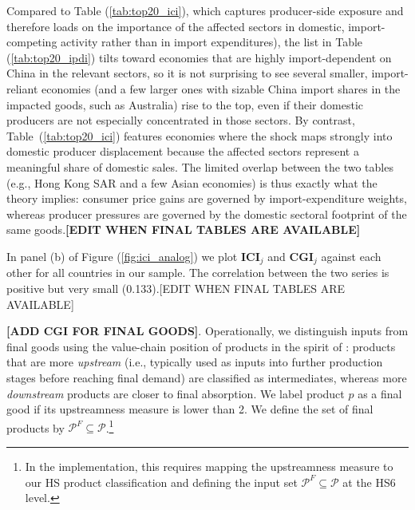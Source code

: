 \documentclass[english,12pt]{article}
\theoremstyle{definition}
\let\oldref\ref
\renewcommand{\ref}[1]{(\oldref{#1})}
\begin{document}
Compared to Table \ref{tab:top20_ici}, which captures producer-side exposure and therefore loads on the importance of the affected sectors in domestic, import-competing activity rather than in import expenditures), the list in Table \ref{tab:top20_ipdi} tilts toward economies that are highly import-dependent on China in the relevant sectors, so it is not surprising to see several smaller, import-reliant economies (and a few larger ones with sizable China import shares in the impacted goods, such as Australia) rise to the top, even if their domestic producers are not especially concentrated in those sectors. By contrast, Table~\ref{tab:top20_ici} features economies where the shock maps strongly into domestic producer displacement because the affected sectors represent a meaningful share of domestic sales. The limited overlap between the two tables (e.g., Hong Kong SAR and a few Asian economies) is thus exactly what the theory implies: consumer price gains are governed by import-expenditure weights, whereas producer pressures are governed by the domestic sectoral footprint of the same goods.\textbf{[EDIT WHEN FINAL TABLES ARE AVAILABLE]}

In panel (b) of Figure \ref{fig:ici_analog} we plot $\boldsymbol{ICI}_{j}$ and $\boldsymbol{CGI}_{j}$ against each other for all countries in our sample. The correlation between the two series is positive but very small (0.133).{[EDIT WHEN FINAL TABLES ARE AVAILABLE]}


\begin{table}[htbp]
\caption{Top 20 economies by Consumer Gains Index (Downstream)($\boldsymbol{CGI}_{j}^{downstream}$)}
\label{tab:top20_ipdi_down}\centering

\end{table}


\textbf{[ADD CGI FOR FINAL GOODS]}. 
Operationally, we distinguish inputs from final goods using the value-chain
position of products in the spirit of \cite{antras2012measuring}: products
that are more \emph{upstream} (i.e., typically used as inputs into further
production stages before reaching final demand) are classified as
intermediates, whereas more \emph{downstream} products are closer to final
absorption. We label product $p$ as a final good if
its upstreamness measure is lower than 2. We define the set of final products by $\mathcal{P}%
^{F}\subseteq \mathcal{P}$.\footnote{%
In the implementation, this requires mapping the upstreamness measure to our
HS product classification and defining the input set $\mathcal{P}^{F}\subseteq \mathcal{P}$ at the HS6 level.}
\end{document}
